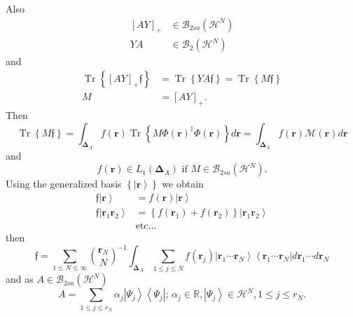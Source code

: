 \documentclass[aps,preprint]{revtex4}%
\begin{document}
Also
\begin{align}
\left[  AY\right]  _{+} &  \in\mathcal{B}_{2sa}\left(  \mathcal{H}^{N}\right)
\\
YA &  \in\mathcal{B}_{2}\left(  \mathcal{H}^{N}\right)
\end{align}
and
\begin{align}
\operatorname{Tr}\left\{  \left[  AY\right]  _{+}\mathfrak{f}\right\}   &
=\operatorname{Tr}\left\{  YA\mathfrak{f}\right\}  =\operatorname{Tr}\left\{
M\mathfrak{f}\right\}  \\
M &  =\left[  AY\right]  _{+}.
\end{align}
Then%
\begin{equation}
\operatorname{Tr}\left\{  M\mathfrak{f}\right\}  =\int_{\boldsymbol{\Delta
}_{A}}f\left(  \boldsymbol{r}\right)  \operatorname{Tr}\left\{  M\Phi\left(
\boldsymbol{r}\right)  ^{\dagger}\Phi\left(  \boldsymbol{r}\right)  \right\}
d\boldsymbol{r=}\int_{\boldsymbol{\Delta}_{A}}f\left(  \boldsymbol{r}\right)
\mathcal{M}\left(  \boldsymbol{r}\right)  d\boldsymbol{r}%
\end{equation}
and
\begin{equation}
f\left(  \boldsymbol{r}\right)  \in L_{1}\left(  \boldsymbol{\Delta}%
_{A}\right)  \text{ if }M\in\mathcal{B}_{2sa}\left(  \mathcal{H}^{N}\right)  .
\end{equation}
Using the generalized basis $\left\{  \left\vert \boldsymbol{r}\right\rangle
\right\}  $ we obtain
\begin{align}
\mathfrak{f}\left\vert \boldsymbol{r}\right\rangle  &  =f\left(
\boldsymbol{r}\right)  \left\vert \boldsymbol{r}\right\rangle \\
\mathfrak{f}\left\vert \boldsymbol{r}_{1}\boldsymbol{r}_{2}\right\rangle  &
=\left\{  f\left(  \boldsymbol{r}_{1}\right)  +f\left(  \boldsymbol{r}%
_{2}\right)  \right\}  \left\vert \boldsymbol{r}_{1}\boldsymbol{r}%
_{2}\right\rangle \\
&  \text{etc...}%
\end{align}
then%
\begin{equation}
\mathfrak{f}=\sum_{1\leq N\leq\infty}\binom{\boldsymbol{r}_{N}}{N}^{-1}%
\int_{\boldsymbol{\Delta}_{A}}\sum_{1\leq j\leq N}f\left(  \boldsymbol{r}%
_{j}\right)  \left\vert \boldsymbol{r}_{1}\cdots\boldsymbol{r}_{N}%
\right\rangle \left\langle \boldsymbol{r}_{1}\cdots\boldsymbol{r}%
_{N}\right\vert d\boldsymbol{r}_{1}\cdots d\boldsymbol{r}_{N}%
\end{equation}
and as $A\in\mathcal{B}_{2sa}\left(  \mathcal{H}^{N}\right)  $%
\begin{equation}
A=\sum_{1\leq j\leq r_{N}}\alpha_{j}\left\vert \Psi_{j}\right\rangle
\left\langle \Psi_{j}\right\vert ;\,\alpha_{j}\in\mathbb{R},\left\vert
\Psi_{j}\right\rangle \in\mathcal{H}^{N},1\leq j\leq r_{N}.
\end{equation}
\end{document}
